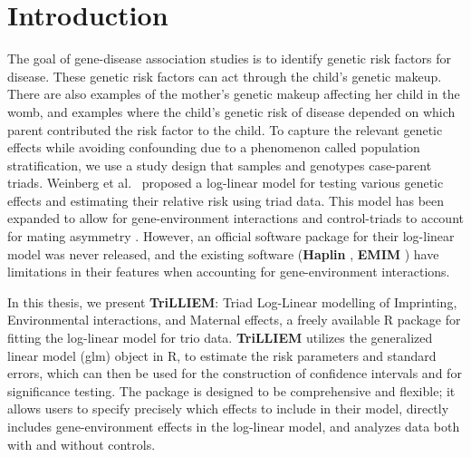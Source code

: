 \chapter{Introduction}\label{chap:intro}

The goal of gene-disease association studies is to identify genetic risk factors for disease.
These genetic risk factors can act through the child's genetic makeup.
There are also examples of the mother's genetic makeup affecting her child in the womb, and examples where the child's genetic risk of disease depended on which parent contributed the risk factor to the child.
To capture the relevant genetic effects while avoiding confounding due to a phenomenon called population stratification, we use  a study design that samples and genotypes case-parent triads.
Weinberg et al.~\cite{Wein+98} proposed a log-linear model for testing various genetic effects and estimating their relative risk using triad data.
This model has been expanded to allow for gene-environment interactions \cite{UmbaWein00} and control-triads to account for mating asymmetry \cite{WeinUmba05}.
However, an official software package for their log-linear model was never released, and the existing software (\textbf{Haplin} \cite{GjesLie06}, \textbf{EMIM} \cite{HoweCord12}) have limitations in their features when accounting for gene-environment interactions.

In this thesis, we present \textbf{TriLLIEM}: Triad Log-Linear modelling of Imprinting, Environmental interactions, and Maternal effects, a freely available R package for fitting the log-linear model for trio data.
\textbf{TriLLIEM} utilizes the generalized linear model (\textsf{glm}) object in R, to estimate the risk parameters and standard errors, which can then be used for the construction of confidence intervals and for significance testing.
The package is designed to be comprehensive and flexible; it allows users to specify precisely which effects to include in their model, directly includes gene-environment effects in the log-linear model, and analyzes data both with and without controls.

